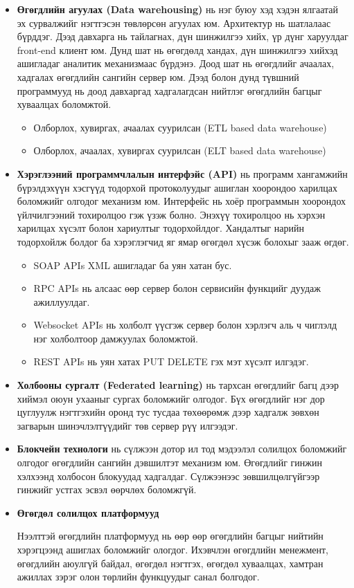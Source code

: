 \begin{itemize}
    \item \textbf{Өгөгдлийн агуулах (Data warehousing)} нь нэг буюу хэд хэдэн ялгаатай эх сурвалжийг нэгтгэсэн төвлөрсөн агуулах юм. Архитектур нь шатлалаас бүрддэг. Дээд давхарга нь тайлагнах, дүн шинжилгээ хийх, үр дүнг харуулдаг front-end клиент юм. Дунд шат нь өгөгдөлд хандах, дүн шинжилгээ хийхэд ашигладаг аналитик механизмаас бүрдэнэ. Доод шат нь өгөгдлийг ачаалах, хадгалах өгөгдлийн сангийн сервер юм. Дээд болон дунд түвшний программууд нь доод давхаргад хадгалагдсан нийтлэг өгөгдлийн багцыг хуваалцах боломжтой.
    \begin{itemize}
        \item Олборлох, хувиргах, ачаалах суурилсан (ETL based data warehouse)
        \item Олборлох, ачаалах, хувиргах суурилсан (ELT based data warehouse)
    \end{itemize}

    \item \textbf{Хэрэглээний программчлалын интерфэйс (API)} нь программ хангамжийн бүрэлдэхүүн хэсгүүд тодорхой протоколуудыг ашиглан хоорондоо харилцах боломжийг олгодог механизм юм. Интерфейс нь хоёр программын хоорондох үйлчилгээний тохиролцоо гэж үзэж болно. Энэхүү тохиролцоо нь хэрхэн харилцах хүсэлт болон хариултыг тодорхойлдог. Хандалтыг нарийн тодорхойлж болдог ба хэрэглэгчид яг ямар өгөгдөл хүсэж болохыг зааж өгдөг.
    \begin{itemize}
        \item SOAP APIs XML ашигладаг ба уян хатан бус.
        \item RPC APIs нь алсаас өөр сервер болон сервисийн функцийг дуудаж ажиллуулдаг.
        \item Websocket APIs нь холболт үүсгэж сервер болон хэрлэгч аль ч чиглэлд нэг холболтоор дамжуулах боломжтой.
        \item REST APIs нь уян хатах PUT DELETE гэх мэт хүсэлт илгэдэг.
    \end{itemize}
    
    \item \textbf{Холбооны сургалт (Federated learning)} нь тархсан өгөгдлийг багц дээр хиймэл оюун ухааныг сургах боломжийг олгодог. Бүх өгөгдлийг нэг дор цуглуулж нэгтгэхийн оронд тус тусдаа төхөөрөмж дээр хадгалж зөвхөн загварын шинэчлэлтүүдийг төв сервер рүү илгээдэг.

    \item \textbf{Блокчейн технологи} нь сүлжээн дотор ил тод мэдээлэл солилцох боломжийг олгодог өгөгдлийн сангийн дэвшилтэт механизм юм. Өгөгдлийг гинжин хэлхээнд холбосон блокуудад хадгалдаг. Сүлжээнээс зөвшилцөлгүйгээр гинжийг устгах эсвэл өөрчлөх боломжгүй.

    \item \textbf{Өгөгдөл солилцох платформууд}
    
    Нээлттэй өгөгдлийн платформууд нь өөр өөр өгөгдлийн багцыг нийтийн хэрэгцээнд ашиглах боломжийг ологдог. Ихэвчлэн өгөгдлийн менежмент, өгөгдлийн аюулгүй байдал, өгөгдөл нэгтгэх, өгөгдөл хуваалцах, хамтран ажиллах зэрэг олон төрлийн функцуудыг санал болгодог. 

\end{itemize}

